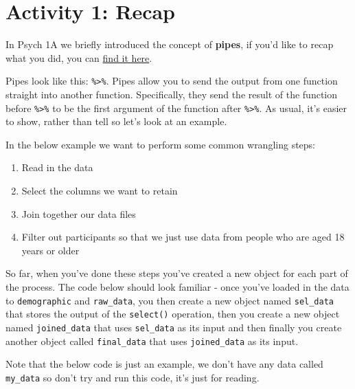 \documentclass[
  oneside]{book}
\providecommand{\tightlist}{%
  \setlength{\itemsep}{0pt}\setlength{\parskip}{0pt}}
\begin{document}
\hypertarget{activity-1-recap}{%
\section{Activity 1: Recap}\label{activity-1-recap}}

In Psych 1A we briefly introduced the concept of \textbf{pipes}, if you'd like to recap what you did, you can \href{https://emilynordmann.github.io/ug1-practical/data-wrangling-1.html\#activity-9-pipes}{find it here}.

Pipes look like this: \texttt{\%\textgreater{}\%}. Pipes allow you to send the output from one function straight into another function. Specifically, they send the result of the function before \texttt{\%\textgreater{}\%} to be the first argument of the function after \texttt{\%\textgreater{}\%}. As usual, it's easier to show, rather than tell so let's look at an example.

In the below example we want to perform some common wrangling steps:

\begin{enumerate}
\def\labelenumi{\arabic{enumi}.}
\tightlist
\item
  Read in the data
\item
  Select the columns we want to retain
\item
  Join together our data files
\item
  Filter out participants so that we just use data from people who are aged 18 years or older
\end{enumerate}

So far, when you've done these steps you've created a new object for each part of the process. The code below should look familiar - once you've loaded in the data to \texttt{demographic} and \texttt{raw\_data}, you then create a new object named \texttt{sel\_data} that stores the output of the \texttt{select()} operation, then you create a new object named \texttt{joined\_data} that uses \texttt{sel\_data} as its input and then finally you create another object called \texttt{final\_data} that uses \texttt{joined\_data} as its input.

Note that the below code is just an example, we don't have any data called \texttt{my\_data} so don't try and run this code, it's just for reading.
\end{document}
